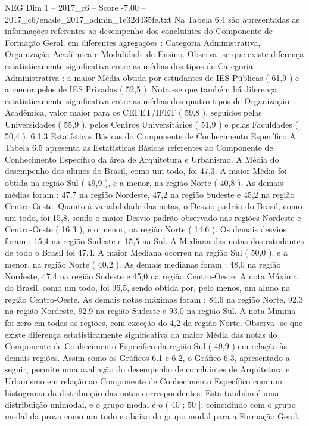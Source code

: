\begin{textsample}{NEG Dim 1 – 2017\_c6 – Score -7.00 – 2017\_c6/enade\_2017\_admin\_1e32d435fe.txt}
Na Tabela 6.4 são apresentadas as informações referentes ao desempenho dos concluintes do Componente de Formação Geral, em diferentes agregações : Categoria Administrativa, Organização Acadêmica e Modalidade de Ensino.
Observa -se que existe diferença estatisticamente significativa entre as médias dos tipos de Categoria Administrativa : a maior Média obtida por estudantes de IES Públicas ( 61,9 ) e a menor pelos de IES Privadas ( 52,5 ).
Nota -se que também há diferença estatisticamente significativa entre as médias dos quatro tipos de Organização Acadêmica, valor maior para os CEFET/IFET ( 59,8 ), seguidos pelas Universidades ( 55,9 ), pelos Centros Universitários ( 51,9 ) e pelas Faculdades ( 50,4 ). 6.1.3 Estatísticas Básicas do Componente de Conhecimento Específico A Tabela 6.5 apresenta as Estatísticas Básicas referentes ao Componente de Conhecimento Específico da área de Arquitetura e Urbanismo.
A Média do desempenho dos alunos do Brasil, como um todo, foi 47,3.
A maior Média foi obtida na região Sul ( 49,9 ), e a menor, na região Norte ( 40,8 ).
As demais médias foram : 47,7 na região Nordeste, 47,2 na região Sudeste e 45,2 na região Centro-Oeste.
Quanto à variabilidade das notas, o Desvio padrão do Brasil, como um todo, foi 15,8, sendo o maior Desvio padrão observado nas regiões Nordeste e Centro-Oeste ( 16,3 ), e o menor, na região Norte ( 14,6 ).
Os demais desvios foram : 15,4 na região Sudeste e 15,5 na Sul.
A Mediana das notas dos estudantes de todo o Brasil foi 47,4.
A maior Mediana ocorreu na região Sul ( 50,0 ), e a menor, na região Norte ( 40,2 ).
As demais medianas foram : 48,0 na região Nordeste, 47,4 na região Sudeste e 45,0 na região Centro-Oeste.
A nota Máxima do Brasil, como um todo, foi 96,5, sendo obtida por, pelo menos, um aluno na região Centro-Oeste.
As demais notas máximas foram : 84,6 na região Norte, 92,3 na região Nordeste, 92,9 na região Sudeste e 93,0 na região Sul.
A nota Mínima foi zero em todas as regiões, com exceção do 4,2 da região Norte.
Observa -se que existe diferença estatisticamente significativa da maior Média das notas do Componente de Conhecimento Específico da região Sul ( 49,9 ) em relação às demais regiões.
Assim como os Gráficos 6.1 e 6.2, o Gráfico 6.3, apresentado a seguir, permite uma avaliação do desempenho de concluintes de Arquitetura e Urbanismo em relação ao Componente de Conhecimento Específico com um histograma da distribuição das notas correspondentes.
Esta também é uma distribuição unimodal, e o grupo modal é o ( 40 ; 50 ], coincidindo com o grupo modal da prova como um todo e abaixo do grupo modal para a Formação Geral.

\end{textsample}
